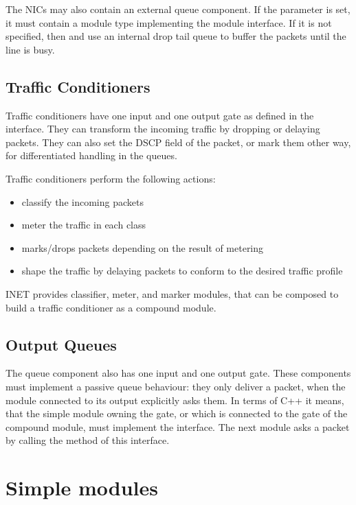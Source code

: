 The NICs may also contain an external queue component. If the 
parameter is set, it must contain a module type implementing the 
module interface. If it is not specified, then  and 
use an internal drop tail queue to buffer the packets until the line is busy. 

\subsection{Traffic Conditioners}

Traffic conditioners have one input
and one output gate as defined in the 
interface. They can transform the incoming traffic by dropping or
delaying packets. They can also set the DSCP field of the packet,
or mark them other way, for differentiated handling in the queues.

Traffic conditioners perform the following actions:
\begin{itemize}
 \item classify the incoming packets
 \item meter the traffic in each class
 \item marks/drops packets depending on the result of metering
 \item shape the traffic by delaying packets to conform to the
       desired traffic profile
\end{itemize}

INET provides classifier, meter, and marker modules, that can be
composed to build a traffic conditioner as a compound module.

\subsection{Output Queues}

The queue component also has one input and one output gate. These components
must implement a passive queue behaviour: they only deliver a packet,
when the module connected to its output explicitly asks them.
In terms of C++ it means, that the simple module owning the  gate,
or which is connected to the  gate of the compound module,
must implement the  interface. The next module
asks a packet by calling the  method of this interface.


\section{Simple modules}

